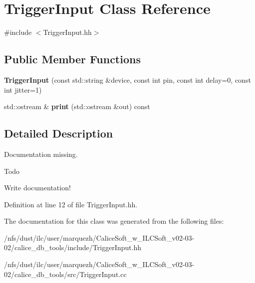 \section{Trigger\-Input Class Reference}
\label{classTriggerInput}


{\ttfamily \#include $<$Trigger\-Input.\-hh$>$}

\subsection*{Public Member Functions}
\begin{DoxyCompactItemize}
\item 
{\bfseries Trigger\-Input} (const std\-::string \&device, const int pin, const int delay=0, const int jitter=1)\label{classTriggerInput_a6134822cc4ebfbdbeabfb445486add7a}

\item 
std\-::ostream \& {\bfseries print} (std\-::ostream \&out) const \label{classTriggerInput_ac491cff98d85e24c22be0dd3ed8f0f62}

\end{DoxyCompactItemize}


\subsection{Detailed Description}
Documentation missing. \begin{DoxyRefDesc}{Todo}
\item[{\bf Todo}]Write documentation!\end{DoxyRefDesc}


Definition at line 12 of file Trigger\-Input.\-hh.



The documentation for this class was generated from the following files\-:\begin{DoxyCompactItemize}
\item 
/nfs/dust/ilc/user/marquezh/\-Calice\-Soft\-\_\-w\-\_\-\-I\-L\-C\-Soft\-\_\-v02-\/03-\/02/calice\-\_\-db\-\_\-tools/include/Trigger\-Input.\-hh\item 
/nfs/dust/ilc/user/marquezh/\-Calice\-Soft\-\_\-w\-\_\-\-I\-L\-C\-Soft\-\_\-v02-\/03-\/02/calice\-\_\-db\-\_\-tools/src/Trigger\-Input.\-cc\end{DoxyCompactItemize}
